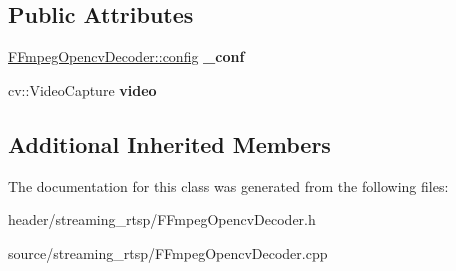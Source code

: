 \subsection*{Public Attributes}
\begin{DoxyCompactItemize}
\item 
\mbox{\label{class_f_fmpeg_opencv_decoder_ab55a686c783ddc11c410e03c44afad2e}} 
\hyperlink{struct_f_fmpeg_opencv_decoder_1_1config}{F\+Fmpeg\+Opencv\+Decoder\+::config} {\bfseries \+\_\+conf}
\item 
\mbox{\label{class_f_fmpeg_opencv_decoder_a88088faff211836083da0014ae3baeb9}} 
cv\+::\+Video\+Capture {\bfseries video}
\end{DoxyCompactItemize}
\subsection*{Additional Inherited Members}


The documentation for this class was generated from the following files\+:\begin{DoxyCompactItemize}
\item 
header/streaming\+\_\+rtsp/F\+Fmpeg\+Opencv\+Decoder.\+h\item 
source/streaming\+\_\+rtsp/F\+Fmpeg\+Opencv\+Decoder.\+cpp\end{DoxyCompactItemize}
